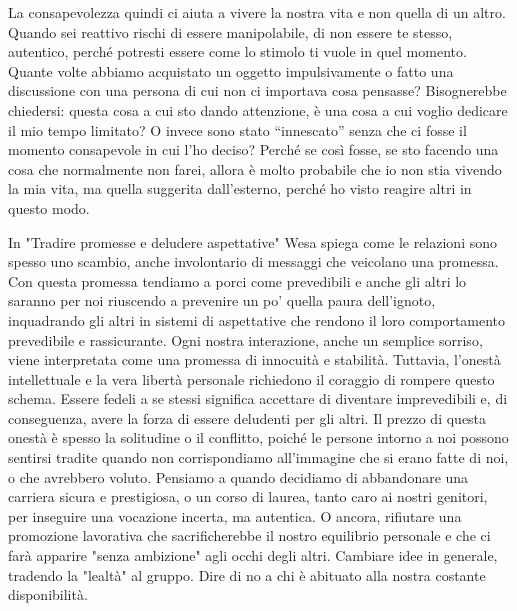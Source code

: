 \documentclass[12pt]{book} %
\begin{document}
La consapevolezza quindi ci aiuta a vivere la nostra vita e non quella di un altro. Quando sei reattivo rischi di essere manipolabile, di non essere te stesso, autentico, perché potresti essere come lo stimolo ti vuole in quel momento. Quante volte abbiamo acquistato un oggetto impulsivamente o fatto una discussione con una persona di cui non ci importava cosa pensasse? 
Bisognerebbe chiedersi: questa cosa a cui sto dando
attenzione, è una cosa a cui voglio dedicare il mio tempo limitato? O invece sono stato “innescato” senza che ci fosse il momento consapevole in cui l'ho deciso? Perché se così fosse, se sto facendo una cosa che normalmente non farei, allora è molto probabile che io non stia vivendo la mia vita, ma quella suggerita dall'esterno, perché ho visto reagire altri in questo modo.

In "Tradire promesse e deludere aspettative" Wesa spiega come le relazioni sono spesso uno scambio, anche involontario di messaggi che veicolano una promessa. Con questa promessa tendiamo a porci come prevedibili e anche gli altri lo saranno per noi riuscendo a prevenire un po' quella paura dell'ignoto, inquadrando gli altri in sistemi di aspettative che rendono il loro comportamento prevedibile e rassicurante. Ogni nostra interazione, anche un semplice sorriso, viene interpretata come una promessa di innocuità e stabilità. Tuttavia, l'onestà intellettuale e la vera libertà personale richiedono il coraggio di rompere questo schema. Essere fedeli a se stessi significa accettare di diventare imprevedibili e, di conseguenza, avere la forza di essere deludenti per gli altri. Il prezzo di questa onestà è spesso la solitudine o il conflitto, poiché le persone intorno a noi possono sentirsi tradite quando non corrispondiamo all'immagine che si erano fatte di noi, o che avrebbero voluto. 
Pensiamo a quando decidiamo di abbandonare una carriera sicura e prestigiosa, o un corso di laurea, tanto caro ai nostri genitori, per inseguire una vocazione incerta, ma autentica. O ancora, rifiutare una promozione lavorativa che sacrificherebbe il nostro equilibrio personale e che ci farà apparire "senza ambizione" agli occhi degli altri. Cambiare idee in generale, tradendo la "lealtà" al gruppo. Dire di no a chi è abituato alla nostra costante disponibilità.
\end{document}

